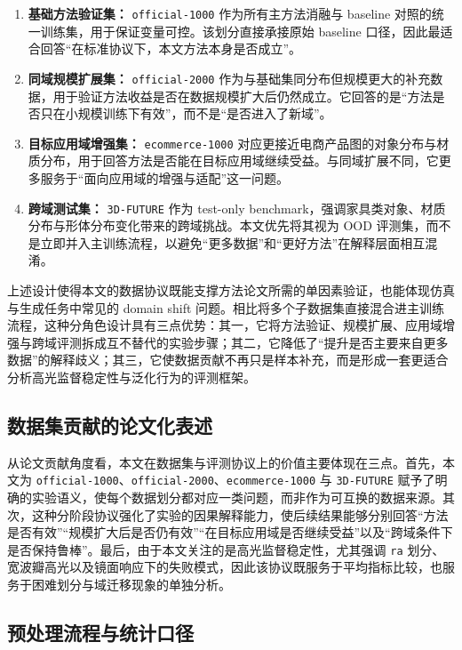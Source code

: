 \documentclass[UTF8,a4paper]{ctexart}
\begin{document}
\begin{enumerate}
\item \textbf{基础方法验证集：} \texttt{official-1000} 作为所有主方法消融与 baseline 对照的统一训练集，用于保证变量可控。该划分直接承接原始 baseline 口径，因此最适合回答“在标准协议下，本文方法本身是否成立”。
\item \textbf{同域规模扩展集：} \texttt{official-2000} 作为与基础集同分布但规模更大的补充数据，用于验证方法收益是否在数据规模扩大后仍然成立。它回答的是“方法是否只在小规模训练下有效”，而不是“是否进入了新域”。
\item \textbf{目标应用域增强集：} \texttt{ecommerce-1000} 对应更接近电商产品图的对象分布与材质分布，用于回答方法是否能在目标应用域继续受益。与同域扩展不同，它更多服务于“面向应用域的增强与适配”这一问题。
\item \textbf{跨域测试集：} \texttt{3D-FUTURE} 作为 test-only benchmark，强调家具类对象、材质分布与形体分布变化带来的跨域挑战。本文优先将其视为 OOD 评测集，而不是立即并入主训练流程，以避免“更多数据”和“更好方法”在解释层面相互混淆。
\end{enumerate}

上述设计使得本文的数据协议既能支撑方法论文所需的单因素验证，也能体现仿真与生成任务中常见的 domain shift 问题。相比将多个子数据集直接混合进主训练流程，这种分角色设计具有三点优势：其一，它将方法验证、规模扩展、应用域增强与跨域评测拆成互不替代的实验步骤；其二，它降低了“提升是否主要来自更多数据”的解释歧义；其三，它使数据贡献不再只是样本补充，而是形成一套更适合分析高光监督稳定性与泛化行为的评测框架。

\subsection{数据集贡献的论文化表述}

从论文贡献角度看，本文在数据集与评测协议上的价值主要体现在三点。首先，本文为 \texttt{official-1000}、\texttt{official-2000}、\texttt{ecommerce-1000} 与 \texttt{3D-FUTURE} 赋予了明确的实验语义，使每个数据划分都对应一类问题，而非作为可互换的数据来源。其次，这种分阶段协议强化了实验的因果解释能力，使后续结果能够分别回答“方法是否有效”“规模扩大后是否仍有效”“在目标应用域是否继续受益”以及“跨域条件下是否保持鲁棒”。最后，由于本文关注的是高光监督稳定性，尤其强调 \texttt{ra} 划分、宽波瓣高光以及镜面响应下的失败模式，因此该协议既服务于平均指标比较，也服务于困难划分与域迁移现象的单独分析。

\subsection{预处理流程与统计口径}
\end{document}
